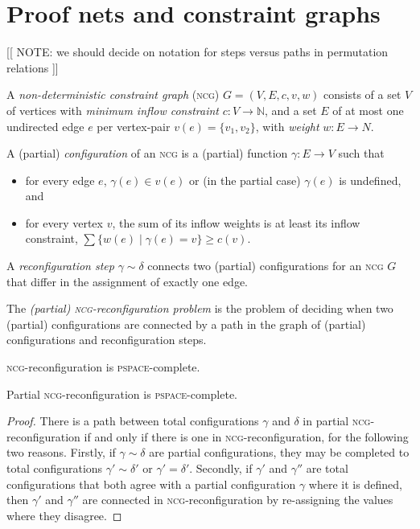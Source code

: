 \section{Proof nets and constraint graphs}



[[ NOTE: we should decide on notation for steps versus paths in permutation relations ]]



\begin{definition} 
A \emph{non-deterministic constraint graph} (\textsc{ncg}) $G=(V,E,c,v,w)$ consists of a set $V$ of vertices with \emph{minimum inflow constraint} $c\colon V\to\mathbb N$, and a set $E$ of at most one undirected edge $e$ per vertex-pair $v(e)=\{v_1,v_2\}$, with \emph{weight} $w\colon E\to N$.

A (partial) \emph{configuration} of an \textsc{ncg} is a (partial) function $\gamma\colon E\to V$ such that
\begin{itemize}
	\item
for every edge $e$, $\gamma(e)\in v(e)$ or (in the partial case) $\gamma(e)$ is undefined, and
	\item
for every vertex $v$, the sum of its inflow weights is at least its inflow constraint, $\sum\{w(e)\mid \gamma(e)=v\}\geq c(v)$.
\end{itemize} 

A \emph{reconfiguration step} $\gamma\sim\delta$ connects two (partial) configurations for an \textsc{ncg} $G$ that differ in the assignment of exactly one edge.

\end{definition}


The \emph{(partial) \textsc{ncg}-reconfiguration problem} is the problem of deciding when two (partial) configurations are connected by a path in the graph of (partial) configurations and reconfiguration steps.

\begin{theorem}
\textsc{ncg}-reconfiguration is \textsc{pspace}-complete.
\end{theorem}

\begin{proposition}
Partial \textsc{ncg}-reconfiguration is \textsc{pspace}-complete.
\end{proposition}

\begin{proof}
There is a path between total configurations $\gamma$ and $\delta$ in partial \textsc{ncg}-reconfiguration if and only if there is one in \textsc{ncg}-reconfiguration, for the following two reasons.
%
Firstly, if $\gamma\sim\delta$ are partial configurations, they may be completed to total configurations $\gamma'\sim\delta'$ or $\gamma'=\delta'$.
%
Secondly, if $\gamma'$ and $\gamma''$ are total configurations that both agree with a partial configuration $\gamma$ where it is defined, then $\gamma'$ and $\gamma''$ are connected in \textsc{ncg}-reconfiguration by re-assigning the values where they disagree.
%
\end{proof}


